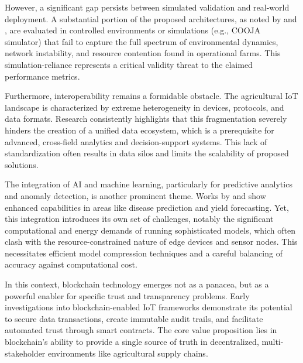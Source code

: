 \documentclass[12pt,onecolumn]{IEEEtran} %
\begin{document}
However, a significant gap persists between simulated validation and real-world deployment. A substantial portion of the proposed architectures, as noted by \cite{bayih2022utilizationofinternet} and \cite{atalla2023iotenabledprecisionagriculture}, are evaluated in controlled environments or simulations (e.g., COOJA simulator) that fail to capture the full spectrum of environmental dynamics, network instability, and resource contention found in operational farms. This simulation-reliance represents a critical validity threat to the claimed performance metrics.

Furthermore, interoperability remains a formidable obstacle. The agricultural IoT landscape is characterized by extreme heterogeneity in devices, protocols, and data formats. Research consistently highlights that this fragmentation \cite{bayih2022utilizationofinternet, bayih2022utilizationofinternet} severely hinders the creation of a unified data ecosystem, which is a prerequisite for advanced, cross-field analytics and decision-support systems. This lack of standardization often results in data silos and limits the scalability of proposed solutions.

The integration of AI and machine learning, particularly for predictive analytics and anomaly detection, is another prominent theme. Works by \cite{bakthavatchalam2022iotframeworkfor} and \cite{ouafiq2022datamanagementand} show enhanced capabilities in areas like disease prediction and yield forecasting. Yet, this integration introduces its own set of challenges, notably the significant computational and energy demands of running sophisticated models, which often clash with the resource-constrained nature of edge devices and sensor nodes. This necessitates efficient model compression techniques and a careful balancing of accuracy against computational cost.

In this context, blockchain technology emerges not as a panacea, but as a powerful enabler for specific trust and transparency problems. Early investigations into blockchain-enabled IoT frameworks \cite{quy2022iotenabledsmartagriculture, abunadi2022trafficawaresecuredcooperative} demonstrate its potential to secure data transactions, create immutable audit trails, and facilitate automated trust through smart contracts. The core value proposition lies in blockchain's ability to provide a single source of truth in decentralized, multi-stakeholder environments like agricultural supply chains.
\end{document}

